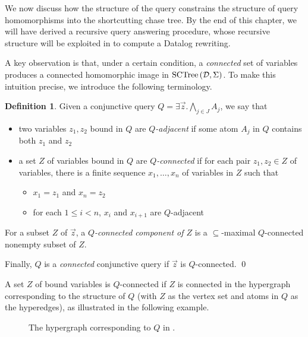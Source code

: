 \documentclass[12pt]{report}
\theoremstyle{plain}
\theoremstyle{definition}
\newtheorem{definition}[theorem]{Definition}
\newcommand{\SCTree}[2]{\ensuremath{\normalfont{\textrm{SCTree}} \left( #1, #2 \right)}}
\begin{document}
We now discuss how the structure of the query constrains the structure of query homomorphisms into the shortcutting chase tree. By the end of this chapter, we will have derived a recursive query answering procedure, whose recursive structure will be exploited in  to compute a Datalog rewriting.

A key observation is that, under a certain condition, a \emph{connected} set of variables produces a connected homomorphic image in $\SCTree{\mathcal{D}}{\Sigma}$. To make this intuition precise, we introduce the following terminology.

\begin{definition}
  Given a conjunctive query $Q = \exists \vec{z}. \bigwedge_{j \in J} A_j$, we say that
  \begin{itemize}
    \item two variables $z_1, z_2$ bound in $Q$ are \emph{$Q$-adjacent} if some atom $A_j$ in $Q$ contains both $z_1$ and $z_2$
    \item a set $Z$ of variables bound in $Q$ are \emph{$Q$-connected} if for each pair $z_1, z_2 \in Z$ of variables, there is a finite sequence $x_1, \ldots, x_n$ of variables in $Z$ such that
    \begin{itemize}
      \item $x_1 = z_1$ and $x_n = z_2$
      \item for each $1 \leq i < n$, $x_i$ and $x_{i+1}$ are $Q$-adjacent
    \end{itemize}
  \end{itemize}

  For a subset $Z$ of $\vec{z}$, a \emph{$Q$-connected component of $Z$} is a $\subseteq$-maximal $Q$-connected nonempty subset of $Z$.

  Finally, $Q$ is a \emph{connected} conjunctive query if $\vec{z}$ is $Q$-connected.
  \qed
\end{definition}

A set $Z$ of bound variables is $Q$-connected if $Z$ is connected in the hypergraph corresponding to the structure of $Q$ (with $Z$ as the vertex set and atoms in $Q$ as the hyperedges), as illustrated in the following example.

\begin{figure}[ht]
  \centering
  
  \caption{The hypergraph corresponding to $Q$ in .}
\end{figure}
\end{document}
